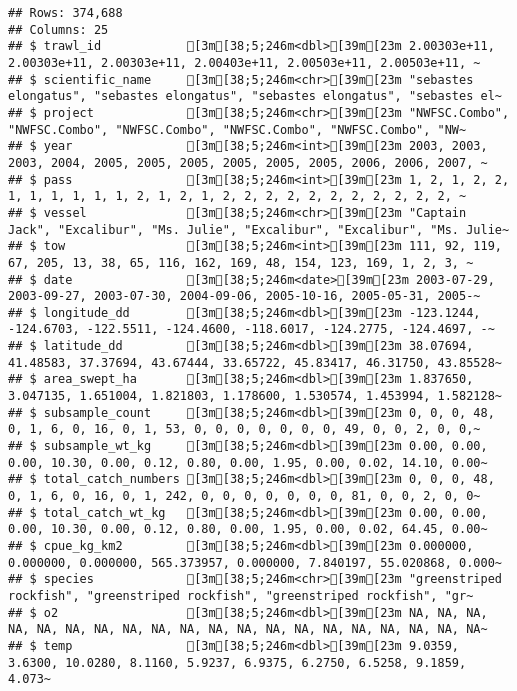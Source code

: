 \documentclass[
]{article}
\begin{document}
\begin{verbatim}
## Rows: 374,688
## Columns: 25
## $ trawl_id            [3m[38;5;246m<dbl>[39m[23m 2.00303e+11, 2.00303e+11, 2.00303e+11, 2.00403e+11, 2.00503e+11, 2.00503e+11, ~
## $ scientific_name     [3m[38;5;246m<chr>[39m[23m "sebastes elongatus", "sebastes elongatus", "sebastes elongatus", "sebastes el~
## $ project             [3m[38;5;246m<chr>[39m[23m "NWFSC.Combo", "NWFSC.Combo", "NWFSC.Combo", "NWFSC.Combo", "NWFSC.Combo", "NW~
## $ year                [3m[38;5;246m<int>[39m[23m 2003, 2003, 2003, 2004, 2005, 2005, 2005, 2005, 2005, 2005, 2006, 2006, 2007, ~
## $ pass                [3m[38;5;246m<int>[39m[23m 1, 2, 1, 2, 2, 1, 1, 1, 1, 1, 1, 2, 1, 2, 1, 2, 2, 2, 2, 2, 2, 2, 2, 2, 2, 2, ~
## $ vessel              [3m[38;5;246m<chr>[39m[23m "Captain Jack", "Excalibur", "Ms. Julie", "Excalibur", "Excalibur", "Ms. Julie~
## $ tow                 [3m[38;5;246m<int>[39m[23m 111, 92, 119, 67, 205, 13, 38, 65, 116, 162, 169, 48, 154, 123, 169, 1, 2, 3, ~
## $ date                [3m[38;5;246m<date>[39m[23m 2003-07-29, 2003-09-27, 2003-07-30, 2004-09-06, 2005-10-16, 2005-05-31, 2005-~
## $ longitude_dd        [3m[38;5;246m<dbl>[39m[23m -123.1244, -124.6703, -122.5511, -124.4600, -118.6017, -124.2775, -124.4697, -~
## $ latitude_dd         [3m[38;5;246m<dbl>[39m[23m 38.07694, 41.48583, 37.37694, 43.67444, 33.65722, 45.83417, 46.31750, 43.85528~
## $ area_swept_ha       [3m[38;5;246m<dbl>[39m[23m 1.837650, 3.047135, 1.651004, 1.821803, 1.178600, 1.530574, 1.453994, 1.582128~
## $ subsample_count     [3m[38;5;246m<dbl>[39m[23m 0, 0, 0, 48, 0, 1, 6, 0, 16, 0, 1, 53, 0, 0, 0, 0, 0, 0, 0, 49, 0, 0, 2, 0, 0,~
## $ subsample_wt_kg     [3m[38;5;246m<dbl>[39m[23m 0.00, 0.00, 0.00, 10.30, 0.00, 0.12, 0.80, 0.00, 1.95, 0.00, 0.02, 14.10, 0.00~
## $ total_catch_numbers [3m[38;5;246m<dbl>[39m[23m 0, 0, 0, 48, 0, 1, 6, 0, 16, 0, 1, 242, 0, 0, 0, 0, 0, 0, 0, 81, 0, 0, 2, 0, 0~
## $ total_catch_wt_kg   [3m[38;5;246m<dbl>[39m[23m 0.00, 0.00, 0.00, 10.30, 0.00, 0.12, 0.80, 0.00, 1.95, 0.00, 0.02, 64.45, 0.00~
## $ cpue_kg_km2         [3m[38;5;246m<dbl>[39m[23m 0.000000, 0.000000, 0.000000, 565.373957, 0.000000, 7.840197, 55.020868, 0.000~
## $ species             [3m[38;5;246m<chr>[39m[23m "greenstriped rockfish", "greenstriped rockfish", "greenstriped rockfish", "gr~
## $ o2                  [3m[38;5;246m<dbl>[39m[23m NA, NA, NA, NA, NA, NA, NA, NA, NA, NA, NA, NA, NA, NA, NA, NA, NA, NA, NA, NA~
## $ temp                [3m[38;5;246m<dbl>[39m[23m 9.0359, 3.6300, 10.0280, 8.1160, 5.9237, 6.9375, 6.2750, 6.5258, 9.1859, 4.073~

\end{verbatim}
\end{document}

